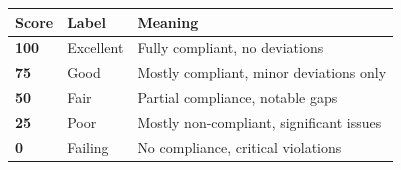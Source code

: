 \documentclass[12pt,a4paper]{article}
\begin{document}
\noindent
\begin{tabular}{C{1.5cm} C{2cm} l}
\toprule
\textbf{Score} & \textbf{Label} & \textbf{Meaning} \\
\midrule
\textcolor{score100}{\textbf{100}} & Excellent & Fully compliant, no deviations \\
\textcolor{score75}{\textbf{75}}   & Good      & Mostly compliant, minor deviations only \\
\textcolor{score50}{\textbf{50}}   & Fair      & Partial compliance, notable gaps \\
\textcolor{score25}{\textbf{25}}   & Poor      & Mostly non-compliant, significant issues \\
\textcolor{score0}{\textbf{0}}     & Failing   & No compliance, critical violations \\
\bottomrule
\end{tabular}
\end{document}
